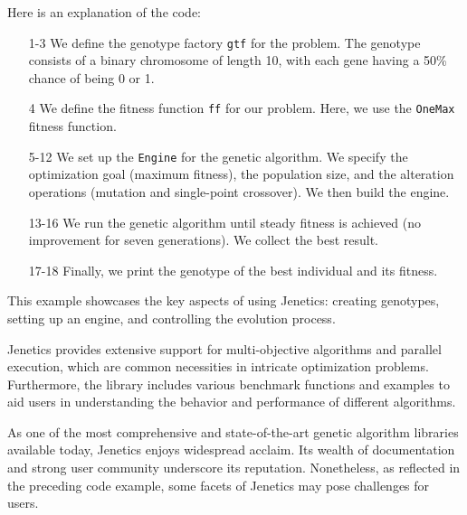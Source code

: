   Here is an explanation of the code:

  \begin{enumerate}
    \item[1-3] We define the genotype factory \texttt{gtf} for the problem.
    The genotype consists of a binary chromosome of length 10, with each gene
    having a 50\% chance of being 0 or 1.
    \item[4] We define the fitness function \texttt{ff} for our problem.
    Here, we use the \texttt{OneMax} fitness function.
    \item[5-12] We set up the \texttt{Engine} for the genetic algorithm.
    We specify the optimization goal (maximum fitness), the population size, and
    the alteration operations (mutation and single-point crossover).
    We then build the engine.
    \item[13-16] We run the genetic algorithm until steady fitness is achieved
    (no improvement for seven generations).
    We collect the best result.
    \item[17-18] Finally, we print the genotype of the best individual and its
    fitness.
  \end{enumerate}

  This example showcases the key aspects of using Jenetics: creating genotypes,
  setting up an engine, and controlling the evolution process.

  Jenetics provides extensive support for multi-objective algorithms and
  parallel execution, which are common necessities in intricate optimization
  problems.
  Furthermore, the library includes various benchmark functions and examples to
  aid users in understanding the behavior and performance of different
  algorithms.

  As one of the most comprehensive and state-of-the-art genetic algorithm
  libraries available today, Jenetics enjoys widespread acclaim.
  Its wealth of documentation and strong user community underscore its
  reputation.
  Nonetheless, as reflected in the preceding code example, some facets of
  Jenetics may pose challenges for users.

